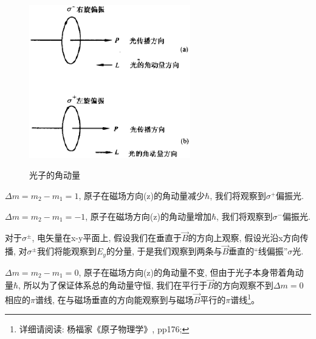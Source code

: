 \begin{figure}[h]
\begin{center}
  \includegraphics[width=7cm]{Spectrum/momentum_of_photon.ps}\\
  \caption{光子的角动量}\label{Angular Momentum of Light}
\end{center}
\end{figure}


$\Delta m = m_2 - m_1 =1$, 原子在磁场方向(z)的角动量减少$\hbar$,
我们将观察到$\sigma^+$偏振光.

$\Delta m = m_2 - m_1 =-1$, 原子在磁场方向(z)的角动量增加$\hbar$,
我们将观察到$\sigma^-$偏振光.

对于$\sigma^{\pm}$, 电矢量在x-y平面上, 假设我们在垂直于$\vec
B$的方向上观察, 假设光沿x方向传播,
对$\sigma^{\pm}$我们将能观察到$E_y$的分量, 于是我们观察到两条与$\vec
B$垂直的``线偏振''$\sigma$光.

$\Delta m =m_2 -m_1 =0$, 原子在磁场方向(z)的角动量不变,
但由于光子本身带着角动量$\hbar$, 所以为了保证体系总的角动量守恒,
我们在平行于$\vec B$的方向观察不到$\Delta m =0$相应的$\pi$谱线,
在与磁场垂直的方向能观察到与磁场$\vec
B$平行的$\pi$谱线\footnote{详细请阅读: 杨福家《原子物理学》,
pp176;}。

